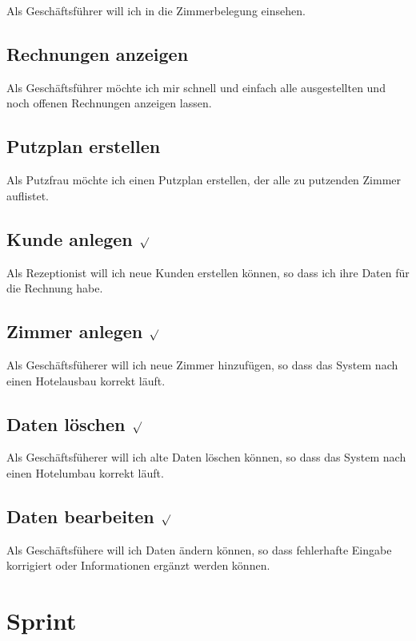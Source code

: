 \documentclass[11pt]{scrartcl}
\begin{document}
Als Geschäftsführer will ich in die Zimmerbelegung einsehen.

\subsection{Rechnungen anzeigen}

Als Geschäftsführer möchte ich mir schnell und einfach alle ausgestellten und noch offenen Rechnungen anzeigen lassen.

\subsection{Putzplan erstellen}

Als Putzfrau möchte ich einen Putzplan erstellen, der alle zu putzenden Zimmer auflistet.

\subsection{Kunde anlegen $\surd$}

Als Rezeptionist will ich neue Kunden erstellen können, so dass ich ihre Daten für die Rechnung habe.

\subsection{Zimmer anlegen $\surd$}

Als Geschäftsfüherer will ich neue Zimmer hinzufügen, so dass das System nach einen Hotelausbau korrekt läuft.

\subsection{Daten löschen $\surd$}

Als Geschäftsfüherer will ich alte Daten löschen können, so dass das System nach einen Hotelumbau korrekt läuft.

\subsection{Daten bearbeiten $\surd$}

Als Geschäftsfühere will ich Daten ändern können, so dass fehlerhafte Eingabe korrigiert oder Informationen ergänzt werden können.

\section{Sprint}
\end{document}
